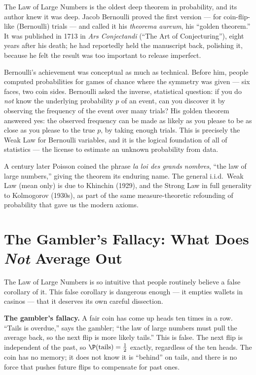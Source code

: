 \begin{historybox}
The Law of Large Numbers is the oldest deep theorem in probability, and its author knew it was deep. Jacob Bernoulli proved the first version --- for coin-flip-like (Bernoulli) trials --- and called it his \emph{theorema aureum}, his ``golden theorem.'' It was published in 1713 in \emph{Ars Conjectandi} (``The Art of Conjecturing''), eight years after his death; he had reportedly held the manuscript back, polishing it, because he felt the result was too important to release imperfect.

Bernoulli's achievement was conceptual as much as technical. Before him, people computed probabilities for games of chance where the symmetry was given --- six faces, two coin sides. Bernoulli asked the inverse, statistical question: if you do \emph{not} know the underlying probability $p$ of an event, can you discover it by observing the frequency of the event over many trials? His golden theorem answered yes: the observed frequency can be made as likely as you please to be as close as you please to the true $p$, by taking enough trials. This is precisely the Weak Law for Bernoulli variables, and it is the logical foundation of all of statistics --- the license to estimate an unknown probability from data.

A century later Poisson coined the phrase \emph{la loi des grands nombres}, ``the law of large numbers,'' giving the theorem its enduring name. The general i.i.d.\ Weak Law (mean only) is due to Khinchin (1929), and the Strong Law in full generality to Kolmogorov (1930s), as part of the same measure-theoretic refounding of probability that gave us the modern axioms.
\end{historybox}

\section{The Gambler's Fallacy: What Does \emph{Not} Average Out}
\label{ch20:gambler}

The Law of Large Numbers is so intuitive that people routinely believe a false corollary of it. This false corollary is dangerous enough --- it empties wallets in casinos --- that it deserves its own careful dissection.

\begin{trapbox}
\textbf{The gambler's fallacy.} A fair coin has come up heads ten times in a row. ``Tails is overdue,'' says the gambler; ``the law of large numbers must pull the average back, so the next flip is more likely tails.'' This is false. The next flip is independent of the past, so $\P(\text{tails}) = \tfrac12$ exactly, regardless of the ten heads. The coin has no memory; it does not know it is ``behind'' on tails, and there is no force that pushes future flips to compensate for past ones.
\end{trapbox}

